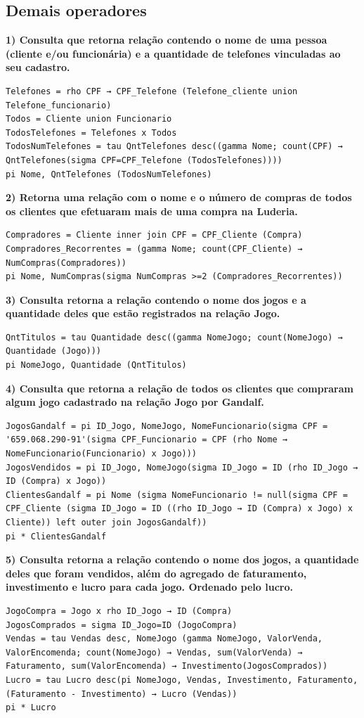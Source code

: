 \documentclass[11pt]{article}
\begin{document}
\subsection{Demais operadores}
\textbf{1) Consulta que retorna relação contendo o nome de uma pessoa (cliente e/ou funcionária) e a quantidade de telefones vinculadas ao seu cadastro.}
\begin{Verbatim}[breaklines=true, breakanywhere=true]
Telefones = rho CPF → CPF_Telefone (Telefone_cliente union Telefone_funcionario)
Todos = Cliente union Funcionario
TodosTelefones = Telefones x Todos
TodosNumTelefones = tau QntTelefones desc((gamma Nome; count(CPF) → QntTelefones(sigma CPF=CPF_Telefone (TodosTelefones))))
pi Nome, QntTelefones (TodosNumTelefones)
\end{Verbatim}
\textbf{2) Retorna uma relação com o nome e o número de compras de todos os clientes que efetuaram mais de uma compra na Luderia.}
\begin{Verbatim}[breaklines=true, breakanywhere=true]
Compradores = Cliente inner join CPF = CPF_Cliente (Compra)
Compradores_Recorrentes = (gamma Nome; count(CPF_Cliente) → NumCompras(Compradores))
pi Nome, NumCompras(sigma NumCompras >=2 (Compradores_Recorrentes))
\end{Verbatim}
\textbf{3) Consulta retorna a relação contendo o nome dos jogos e a quantidade deles que estão registrados na relação Jogo.}
\begin{Verbatim}[breaklines=true, breakanywhere=true]
QntTitulos = tau Quantidade desc((gamma NomeJogo; count(NomeJogo) → Quantidade (Jogo)))
pi NomeJogo, Quantidade (QntTitulos)
\end{Verbatim}
\textbf{4) Consulta que retorna a relação de todos os clientes que compraram algum jogo cadastrado na relação Jogo por Gandalf.}
\begin{Verbatim}[breaklines=true, breakanywhere=true]
JogosGandalf = pi ID_Jogo, NomeJogo, NomeFuncionario(sigma CPF = '659.068.290-91'(sigma CPF_Funcionario = CPF (rho Nome → NomeFuncionario(Funcionario) x Jogo)))
JogosVendidos = pi ID_Jogo, NomeJogo(sigma ID_Jogo = ID (rho ID_Jogo → ID (Compra) x Jogo))
ClientesGandalf = pi Nome (sigma NomeFuncionario != null(sigma CPF = CPF_Cliente (sigma ID_Jogo = ID ((rho ID_Jogo → ID (Compra) x Jogo) x Cliente)) left outer join JogosGandalf))
pi * ClientesGandalf
\end{Verbatim}
\textbf{5) Consulta retorna a relação contendo o nome dos jogos, a quantidade deles que foram vendidos, além do agregado de faturamento, investimento e lucro para cada jogo. Ordenado pelo lucro.}
\begin{Verbatim}[breaklines=true, breakanywhere=true]
JogoCompra = Jogo x rho ID_Jogo → ID (Compra)
JogosComprados = sigma ID_Jogo=ID (JogoCompra)
Vendas = tau Vendas desc, NomeJogo (gamma NomeJogo, ValorVenda, ValorEncomenda; count(NomeJogo) → Vendas, sum(ValorVenda) → Faturamento, sum(ValorEncomenda) → Investimento(JogosComprados))
Lucro = tau Lucro desc(pi NomeJogo, Vendas, Investimento, Faturamento, (Faturamento - Investimento) → Lucro (Vendas))
pi * Lucro
\end{Verbatim}
\end{document}
